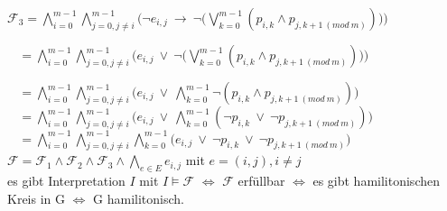 \documentclass[11pt,a4paper,onecolumn,oneside]{scrartcl}
\begin{document}
$\displaystyle\mathcal{F}_3 = \bigwedge_{i=0}^{m-1} \bigwedge_{j=0, j \ne i}^{m-1} \bigg(\neg e_{i,j}~\to~\neg\Big(\bigvee_{k=0}^{m-1} (p_{i,k} \wedge p_{j,k+1~(mod~m)})\Big)\bigg)$

$\displaystyle~~~~= \bigwedge_{i=0}^{m-1} \bigwedge_{j=0, j \ne i}^{m-1} \bigg( e_{i,j}~\vee~\neg\Big(\bigvee_{k=0}^{m-1} (p_{i,k} \wedge p_{j,k+1~(mod~m)})\Big)\bigg)$

$\displaystyle~~~~= \bigwedge_{i=0}^{m-1} \bigwedge_{j=0, j \ne i}^{m-1} \bigg( e_{i,j}~\vee~\bigwedge_{k=0}^{m-1} \neg (p_{i,k} \wedge p_{j,k+1~(mod~m)})\bigg)$\\

$\displaystyle~~~~= \bigwedge_{i=0}^{m-1} \bigwedge_{j=0, j \ne i}^{m-1} \Big( e_{i,j}~\vee~\bigwedge_{k=0}^{m-1} (\neg p_{i,k}~\vee~\neg p_{j,k+1~(mod~m)})\Big)$\\

$\displaystyle~~~~= \bigwedge_{i=0}^{m-1} \bigwedge_{j=0, j \ne i}^{m-1} \bigwedge_{k=0}^{m-1} \Big( e_{i,j}~\vee~\neg p_{i,k}~\vee~\neg p_{j,k+1~(mod~m)}\Big)$\\



$\displaystyle\mathcal{F} = \mathcal{F}_1 \wedge \mathcal{F}_2 \wedge \mathcal{F}_3 \wedge \bigwedge_{e \in E} e_{i,j}$ mit $e=(i,j), i \ne j$\\


es gibt Interpretation $I$ mit $I\models\mathcal{F}$ $\Leftrightarrow$ $\mathcal{F}$ erfüllbar $\Leftrightarrow$ es gibt hamilitonischen Kreis in G $\Leftrightarrow$ G hamilitonisch.
\end{document}
